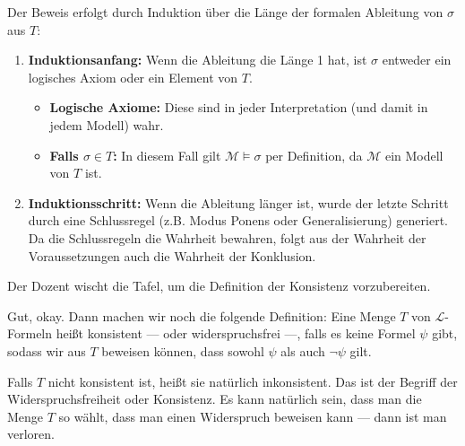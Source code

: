 \begin{math-stroke}
\begin{short-proof}[Beweisidee]
Der Beweis erfolgt durch Induktion über die Länge der formalen Ableitung von $\sigma$ aus $T$:
\begin{enumerate}[label=\textbf{\arabic*.}]
    \item \textbf{Induktionsanfang:} Wenn die Ableitung die Länge 1 hat, ist $\sigma$ entweder ein logisches Axiom oder ein Element von $T$.
    \begin{itemize}
        \item \textbf{Logische Axiome:} Diese sind in jeder Interpretation (und damit in jedem Modell) wahr.
        \item \textbf{Falls $\sigma \in T$:} In diesem Fall gilt $\mathcal{M} \models \sigma$ per Definition, da $\mathcal{M}$ ein Modell von $T$ ist.
    \end{itemize}
    \item \textbf{Induktionsschritt:} Wenn die Ableitung länger ist, wurde der letzte Schritt durch eine Schlussregel (z.B. Modus Ponens oder Generalisierung) generiert. Da die Schlussregeln die Wahrheit bewahren, folgt aus der Wahrheit der Voraussetzungen auch die Wahrheit der Konklusion.
\end{enumerate}
\end{short-proof}
\end{math-stroke}

\begin{ai-global-state-checkpoint-invisible-content}
\end{ai-global-state-checkpoint-invisible-content}

\begin{lecture-break}[Tafelreinigung]
Der Dozent wischt die Tafel, um die Definition der Konsistenz vorzubereiten.
\end{lecture-break}

\begin{spoken-clean}[00:24:41 - 00:26:35]
Gut, okay. Dann machen wir noch die folgende Definition: Eine Menge $T$ von $\mathcal{L}$-Formeln heißt konsistent --- oder widerspruchsfrei ---, falls es keine Formel $\psi$ gibt, sodass wir aus $T$ beweisen können, dass sowohl $\psi$ als auch $\neg\psi$ gilt.

Falls $T$ nicht konsistent ist, heißt sie natürlich inkonsistent. Das ist der Begriff der Widerspruchsfreiheit oder Konsistenz. Es kann natürlich sein, dass man die Menge $T$ so wählt, dass man einen Widerspruch beweisen kann --- dann ist man verloren.
\end{spoken-clean}

